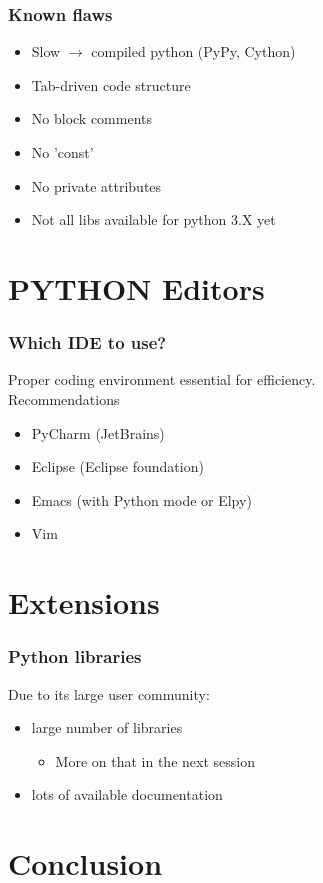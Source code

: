\documentclass[14pt]{beamer}
\begin{document}
\begin{frame}
\frametitle{Known flaws}
\begin{itemize}
\item Slow $\rightarrow$ compiled python (PyPy, Cython)
\item Tab-driven code structure
\item No block comments
\item No 'const'
\item No private attributes
\item Not all libs available for python 3.X yet
\end{itemize}
\end{frame}

\section{PYTHON Editors}
\begin{frame}
\frametitle{Which IDE to use?}
\alert{Proper coding environment essential for efficiency.}\\
Recommendations
\begin{itemize}
\item PyCharm (JetBrains)
\item Eclipse (Eclipse foundation)
\item Emacs (with Python mode or Elpy)
\item Vim
\end{itemize}
\end{frame}

\section{Extensions}

\begin{frame}
\frametitle{Python libraries}
Due to its large user community:
\begin{itemize}
\item large number of libraries
\begin{itemize}
\item More on that in the next session
\end{itemize}
\item lots of available documentation
\end{itemize}
\end{frame}

\section{Conclusion}
\end{document}
